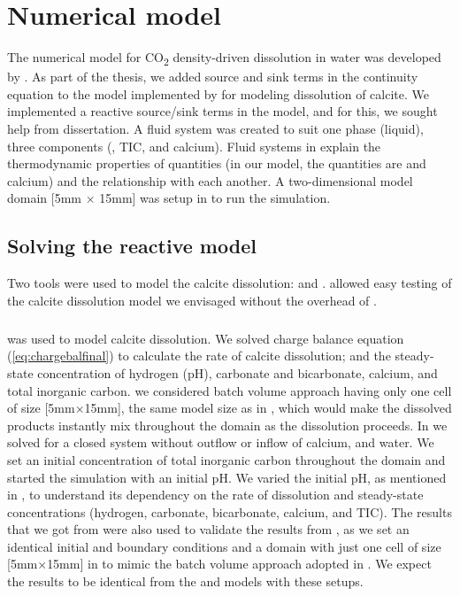 \chapter{Numerical model}\label{chapter:numericalmodel}
\thispagestyle{empty}

The numerical model for CO\textsubscript{2} density-driven dissolution in water was developed by 
\citet{Class2020}. As part of the thesis, we added source and sink terms in the continuity equation 
to the  model implemented by \citet{Class2020} for modeling dissolution of calcite. We implemented a 
reactive source/sink terms in the model, and for this, we sought help from \citet{hommel2016modeling} dissertation. 
A fluid system was created to suit one phase (liquid), three components (, TIC, and calcium). 
Fluid systems in \DuMuX explain the thermodynamic properties of quantities (in our model, the quantities are 
 and calcium) and the relationship with each another. A two-dimensional model domain [5mm $\times$ 15mm] 
was setup in \DuMuX to run the simulation.

\section{Solving the reactive model}
Two tools were used to model the calcite dissolution: \MATLAB and \DuMuX. \MATLAB allowed easy testing of the 
calcite dissolution model we envisaged without the overhead of \DuMuX.

\paragraph*{\MATLAB} was used to model calcite dissolution. We solved charge balance equation (\ref{eq:chargebalfinal}) 
to calculate the rate of calcite dissolution; and the steady-state concentration of hydrogen (pH), carbonate and bicarbonate, 
calcium, and total inorganic carbon. we considered batch volume approach having only one cell of size [5mm$\times$15mm], 
the same model size as in \DuMuX , which would make the dissolved products instantly mix throughout the domain as 
the dissolution proceeds. In \MATLAB we solved for a closed system without outflow or inflow of calcium,  and water. 
We set an initial concentration of total inorganic carbon throughout the domain and started the simulation with an initial pH. 
We varied the initial pH, as mentioned in , to understand its dependency on the rate of dissolution and 
steady-state concentrations (hydrogen, carbonate, bicarbonate, calcium, and TIC). The results that we got from \MATLAB were 
also used to validate the results from \DuMuX, as we set an identical initial and boundary conditions and a domain with just 
one cell of size [5mm$\times$15mm] in \DuMuX to mimic the batch volume approach adopted in \MATLAB. We expect the results 
to be identical from the \MATLAB and \DuMuX models with these setups. \\

